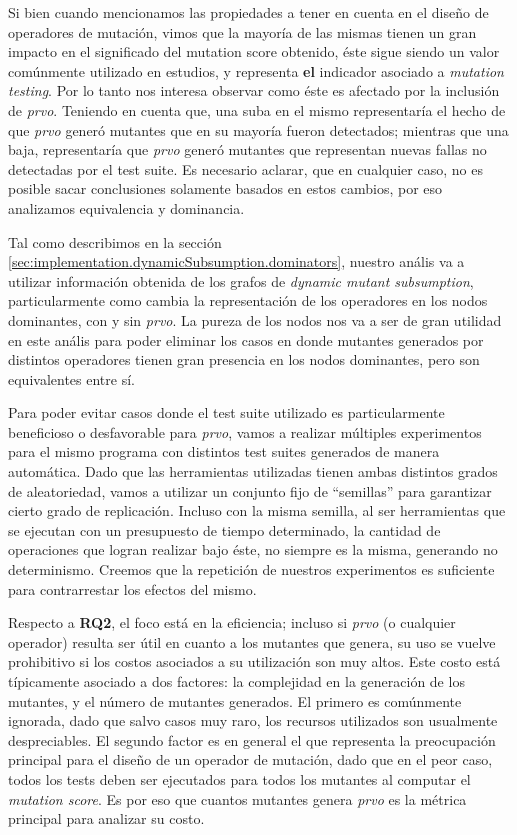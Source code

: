 Si bien cuando mencionamos las propiedades a tener en cuenta en el dise\~no de operadores de mutaci\'on, vimos que la mayor\'ia de las mismas tienen un gran impacto en el significado del mutation score obtenido, \'este sigue siendo un valor com\'unmente utilizado en estudios, y representa \textbf{el} indicador asociado a \emph{mutation testing}. Por lo tanto nos interesa observar como \'este es afectado por la inclusi\'on de \emph{prvo}. Teniendo en cuenta que, una suba en el mismo representar\'ia el hecho de que \emph{prvo} gener\'o mutantes que en su mayor\'ia fueron detectados; mientras que una baja, representar\'ia que \emph{prvo} gener\'o mutantes que representan nuevas fallas no detectadas por el test suite. Es necesario aclarar, que en cualquier caso, no es posible sacar conclusiones solamente basados en estos cambios, por eso analizamos equivalencia y dominancia.

Tal como describimos en la secci\'on \ref{sec:implementation.dynamicSubsumption.dominators}, nuestro an\'alis va a utilizar informaci\'on obtenida de los grafos de \emph{dynamic mutant subsumption}, particularmente como cambia la representaci\'on de los operadores en los nodos dominantes, con y sin \emph{prvo}. La pureza de los nodos nos va a ser de gran utilidad en este an\'alis para poder eliminar los casos en donde mutantes generados por distintos operadores tienen gran presencia en los nodos dominantes, pero son equivalentes entre s\'i.

Para poder evitar casos donde el test suite utilizado es particularmente beneficioso o desfavorable para \emph{prvo}, vamos a realizar m\'ultiples experimentos para el mismo programa con distintos test suites generados de manera autom\'atica. Dado que las herramientas utilizadas tienen ambas distintos grados de aleatoriedad, vamos a utilizar un conjunto fijo de ``semillas'' para garantizar cierto grado de replicaci\'on. Incluso con la misma semilla, al ser herramientas que se ejecutan con un presupuesto de tiempo determinado, la cantidad de operaciones que logran realizar bajo \'este, no siempre es la misma, generando no determinismo. Creemos que la repetici\'on de nuestros experimentos es suficiente para contrarrestar los efectos del mismo.

Respecto a \textbf{RQ2}, el foco est\'a en la eficiencia; incluso si \emph{prvo} (o cualquier operador) resulta ser \'util en cuanto a los mutantes que genera, su uso se vuelve prohibitivo si los costos asociados a su utilizaci\'on son muy altos. Este costo est\'a t\'ipicamente asociado a dos factores: la complejidad en la generaci\'on de los mutantes, y el n\'umero de mutantes generados. El primero es com\'unmente ignorada, dado que salvo casos muy raro, los recursos utilizados son usualmente despreciables. El segundo factor es en general el que representa la preocupaci\'on principal para el dise\~no de un operador de mutaci\'on, dado que en el peor caso, todos los tests deben ser ejecutados para todos los mutantes al computar el \emph{mutation score}. Es por eso que cuantos mutantes genera \emph{prvo} es la m\'etrica principal para analizar su costo.

